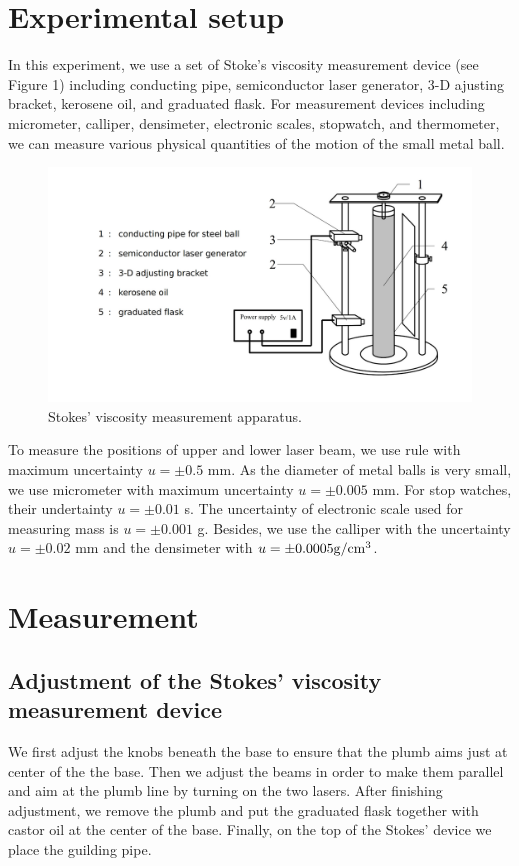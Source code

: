 \documentclass[a4paper]{report}
\begin{document}
	\section{Experimental setup}
	In this experiment, we use a set of Stoke's viscosity measurement device (see Figure 1) including conducting pipe, semiconductor laser generator, 3-D ajusting bracket, kerosene oil, and graduated flask. For measurement devices including micrometer, calliper, densimeter, electronic scales, stopwatch, and thermometer, we can measure various physical quantities of the motion of the small metal ball.
	\begin{figure}[H]
		\centering
		\includegraphics[width=1\linewidth]{1.jpg}
		\caption{Stokes' viscosity measurement apparatus.}
	\end{figure}
	To measure the positions of upper and lower laser beam, we use rule with maximum uncertainty $u=\pm 0.5$ mm. As the diameter of metal balls is very small, we use micrometer with maximum uncertainty $u=\pm 0.005$ mm. For stop watches, their undertainty $u=\pm 0.01$ s. The uncertainty of electronic scale used for measuring mass is $u=\pm 0.001$ g. Besides, we use the calliper with the uncertainty $u=\pm 0.02$ mm and the densimeter with $u=\pm 0.0005 \rm{g/{cm}^3}$.
	\section{Measurement}
	\subsection{Adjustment of the Stokes' viscosity measurement device}
	We first adjust the knobs beneath the base to ensure that the plumb aims just at center of the the base. Then we adjust the beams in order to make them parallel and aim at the plumb line by turning on the two lasers. After finishing adjustment, we remove the plumb and put the graduated flask together with castor oil at the center of the base. Finally, on the top of the Stokes' device we place the guilding pipe.
\end{document}
